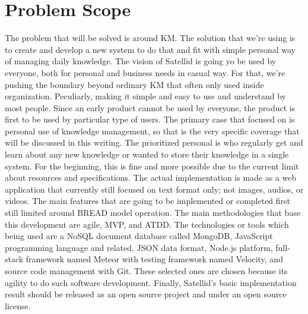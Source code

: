 \section{Problem Scope}
\label{sec:problem-scope}

The problem that will be solved is around \ac{KM}.
The solution that we're using is to create and develop a new system to do that and fit with simple personal way of managing daily knowledge.
The vision of Satellid is going yo be used by everyone, both for personal and business needs in casual way.
For that, we're pushing the boundary beyond ordinary \ac{KM} that often only used inside organization.
Peculiarly, making it simple and easy to use and understand by most people.
Since an early product cannot be used by everyone, the product is first to be used by particular type of users.
The primary case that focused on is personal use of knowledge management, so that is the very specific coverage that will be discussed in this writing.
The prioritized personal is who regularly get and learn about any new knowledge or wanted to store their knowledge in a single system.
For the beginning, this is fine and more possible due to the current limit about resources and specifications.
The actual implementation is made as a web application that currently still focused on text format only; not images, audios, or videos.
The main features that are going to be implemented or completed first still limited around \ac{BREAD} model operation.
The main methodologies that base this development are agile, \ac{MVP}, and \ac{ATDD}.
The technologies or tools which being used are a NoSQL document database called MongoDB, JavaScript programming language and related, JSON data format, Node.js platform, full-stack framework named Meteor with testing framework named Velocity, and source code management with Git.
These selected ones are chosen because its agility to do such software development.
Finally, Satellid's basic implementation result should be released as an open source project and under an open source license.
